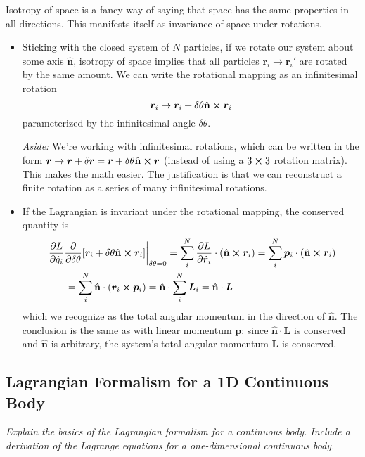 \documentclass[11pt, a4paper]{article}
\newcommand{\uvec}[1]{\hat{\mathbf{#1}}}
\newcommand{\bdot}[1]{\dot{\bm{#1}}}
\begin{document}
\smallskip
Isotropy of space is a fancy way of saying that space has the same properties in all directions. This manifests itself as invariance of space under rotations. 
\begin{itemize}

	\item Sticking with the closed system of $ N $ particles, if we rotate our system about some axis $ \uvec{n} $, isotropy of space implies that all particles $ \bm{r}_{i} \to \bm{r}_{i}' $ are rotated by the same amount. We can write the rotational mapping as an infinitesimal rotation
	\begin{equation*}
		\bm{r}_{i} \to \bm{r}_{i} + \delta \theta \uvec{n} \cross \bm{r}_{i}
	\end{equation*}
	parameterized by the infinitesimal angle $ \delta \theta $. 
	
	\textit{Aside:} We're working with infinitesimal rotations, which can be written in the form $ \bm{r} \to \bm{r} + \delta \bm{r} = \bm{r} +  \delta \theta \uvec{n} \cross \bm{r} $ (instead of using a $ 3 \cross 3 $ rotation matrix). This makes the math easier. The justification is that we can reconstruct a finite rotation as a series of many infinitesimal rotations.
	
	\item If the Lagrangian is invariant under the rotational mapping, the conserved quantity is
	\begin{align*}
		&\eval{\pdv{L}{\dot{q}_{i}} \pdv{}{\delta \theta}[\bm{r}_{i} + \delta \theta \uvec{n} \cross \bm{r}_{i}]}_{\delta \theta=0} = \sum_{i}^{N} \pdv{L}{\bdot{r}_{i}} \cdot (\uvec{n} \cross \bm{r}_{i}) =  \sum_{i}^{N} \bm{p}_{i} \cdot (\uvec{n} \cross \bm{r}_{i})\\
		&{}\qquad=  \sum_{i}^{N} \uvec{n} \cdot ( \bm{r}_{i} \cross \bm{p}_{i}) =  \uvec{n} \cdot \sum_{i}^{N}  \bm{L}_{i} = \uvec{n} \cdot \bm{L}
	\end{align*}
	which we recognize as the total angular momentum in the direction of $ \uvec{n} $. The conclusion is the same as with linear momentum $ \bm{p} $: since $ \uvec{n} \cdot \bm{L} $ is conserved and $ \uvec{n} $ is arbitrary, the system's total angular momentum $ \bm{L} $ is conserved.
	
\end{itemize}

\subsection{Lagrangian Formalism for a 1D Continuous Body}
\textit{Explain the basics of the Lagrangian formalism for a continuous body. Include a derivation of the Lagrange equations for a one-dimensional continuous body.}
\end{document}
